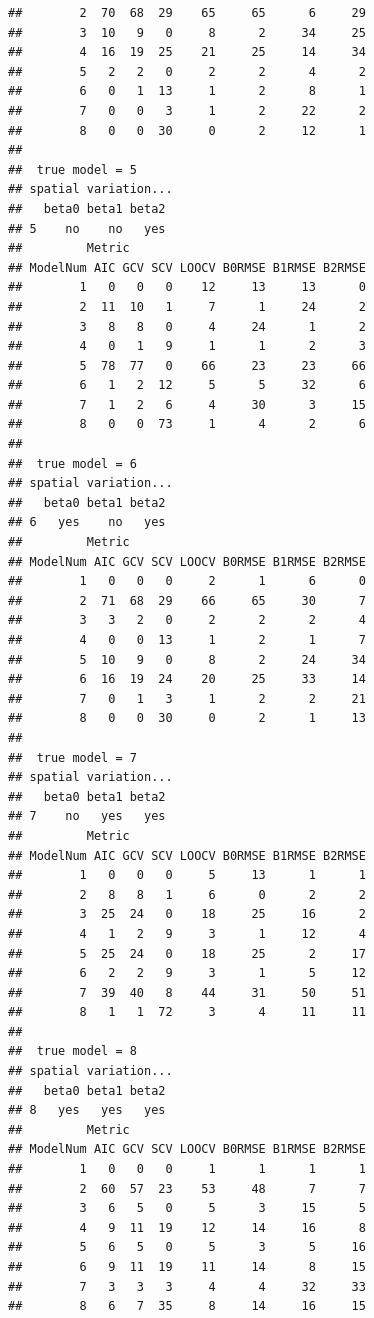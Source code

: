 \documentclass{article}\usepackage{graphicx, color}
\makeatletter
\newenvironment{kframe}{%
 \def\at@end@of@kframe{}%
 \ifinner\ifhmode%
  \def\at@end@of@kframe{\end{minipage}}%
  \begin{minipage}{\columnwidth}%
 \fi\fi%
 \def\FrameCommand##1{\hskip\@totalleftmargin \hskip-\fboxsep
 \colorbox{shadecolor}{##1}\hskip-\fboxsep
     \hskip-\linewidth \hskip-\@totalleftmargin \hskip\columnwidth}%
 \MakeFramed {\advance\hsize-\width
   \@totalleftmargin\z@ \linewidth\hsize
   \@setminipage}}%
 {\par\unskip\endMakeFramed%
 \at@end@of@kframe}
\newenvironment{knitrout}{}{} %
\makeatother
\begin{document}
\begin{knitrout}
\begin{kframe}
\begin{verbatim}
##        2  70  68  29    65     65      6     29
##        3  10   9   0     8      2     34     25
##        4  16  19  25    21     25     14     34
##        5   2   2   0     2      2      4      2
##        6   0   1  13     1      2      8      1
##        7   0   0   3     1      2     22      2
##        8   0   0  30     0      2     12      1
## 
##  true model = 5 
## spatial variation...
##   beta0 beta1 beta2
## 5    no    no   yes
##         Metric
## ModelNum AIC GCV SCV LOOCV B0RMSE B1RMSE B2RMSE
##        1   0   0   0    12     13     13      0
##        2  11  10   1     7      1     24      2
##        3   8   8   0     4     24      1      2
##        4   0   1   9     1      1      2      3
##        5  78  77   0    66     23     23     66
##        6   1   2  12     5      5     32      6
##        7   1   2   6     4     30      3     15
##        8   0   0  73     1      4      2      6
## 
##  true model = 6 
## spatial variation...
##   beta0 beta1 beta2
## 6   yes    no   yes
##         Metric
## ModelNum AIC GCV SCV LOOCV B0RMSE B1RMSE B2RMSE
##        1   0   0   0     2      1      6      0
##        2  71  68  29    66     65     30      7
##        3   3   2   0     2      2      2      4
##        4   0   0  13     1      2      1      7
##        5  10   9   0     8      2     24     34
##        6  16  19  24    20     25     33     14
##        7   0   1   3     1      2      2     21
##        8   0   0  30     0      2      1     13
## 
##  true model = 7 
## spatial variation...
##   beta0 beta1 beta2
## 7    no   yes   yes
##         Metric
## ModelNum AIC GCV SCV LOOCV B0RMSE B1RMSE B2RMSE
##        1   0   0   0     5     13      1      1
##        2   8   8   1     6      0      2      2
##        3  25  24   0    18     25     16      2
##        4   1   2   9     3      1     12      4
##        5  25  24   0    18     25      2     17
##        6   2   2   9     3      1      5     12
##        7  39  40   8    44     31     50     51
##        8   1   1  72     3      4     11     11
## 
##  true model = 8 
## spatial variation...
##   beta0 beta1 beta2
## 8   yes   yes   yes
##         Metric
## ModelNum AIC GCV SCV LOOCV B0RMSE B1RMSE B2RMSE
##        1   0   0   0     1      1      1      1
##        2  60  57  23    53     48      7      7
##        3   6   5   0     5      3     15      5
##        4   9  11  19    12     14     16      8
##        5   6   5   0     5      3      5     16
##        6   9  11  19    11     14      8     15
##        7   3   3   3     4      4     32     33
##        8   6   7  35     8     14     16     15
\end{verbatim}
\end{kframe}
\end{knitrout}
\end{document}
